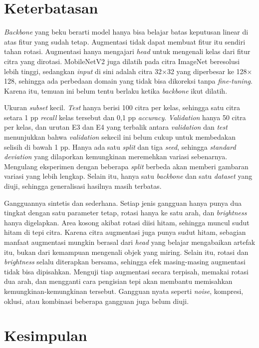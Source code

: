 \documentclass[conference]{IEEEtran}
\begin{document}
\section{Keterbatasan}

\emph{Backbone} yang beku berarti model hanya bisa belajar batas keputusan linear di atas fitur yang sudah tetap. Augmentasi tidak dapat membuat fitur itu sendiri tahan rotasi. Augmentasi hanya mengajari \emph{head} untuk mengenali kelas dari fitur citra yang dirotasi. MobileNetV2 juga dilatih pada citra ImageNet beresolusi lebih tinggi, sedangkan \emph{input} di sini adalah citra 32$\times$32 yang diperbesar ke 128$\times$128, sehingga ada perbedaan domain yang tidak bisa dikoreksi tanpa \emph{fine-tuning}. Karena itu, temuan ini belum tentu berlaku ketika \emph{backbone} ikut dilatih.

Ukuran \emph{subset} kecil. \emph{Test} hanya berisi 100 citra per kelas, sehingga satu citra setara 1 pp \emph{recall} kelas tersebut dan 0,1 pp \emph{accuracy}. \emph{Validation} hanya 50 citra per kelas, dan urutan E3 dan E4 yang terbalik antara \emph{validation} dan \emph{test} menunjukkan bahwa \emph{validation} sekecil ini belum cukup untuk membedakan selisih di bawah 1 pp. Hanya ada satu \emph{split} dan tiga \emph{seed}, sehingga \emph{standard deviation} yang dilaporkan kemungkinan meremehkan variasi sebenarnya. Mengulang eksperimen dengan beberapa \emph{split} berbeda akan memberi gambaran variasi yang lebih lengkap. Selain itu, hanya satu \emph{backbone} dan satu \emph{dataset} yang diuji, sehingga generalisasi hasilnya masih terbatas.

Gangguannya sintetis dan sederhana. Setiap jenis gangguan hanya punya dua tingkat dengan satu parameter tetap, rotasi hanya ke satu arah, dan \emph{brightness} hanya digelapkan. Area kosong akibat rotasi diisi hitam, sehingga muncul sudut hitam di tepi citra. Karena citra augmentasi juga punya sudut hitam, sebagian manfaat augmentasi mungkin berasal dari \emph{head} yang belajar mengabaikan artefak itu, bukan dari kemampuan mengenali objek yang miring. Selain itu, rotasi dan \emph{brightness} selalu diterapkan bersama, sehingga efek masing-masing augmentasi tidak bisa dipisahkan. Menguji tiap augmentasi secara terpisah, memakai rotasi dua arah, dan mengganti cara pengisian tepi akan membantu memisahkan kemungkinan-kemungkinan tersebut. Gangguan nyata seperti \emph{noise}, kompresi, oklusi, atau kombinasi beberapa gangguan juga belum diuji.

\section{Kesimpulan}\label{sec:conclusion}
\end{document}
